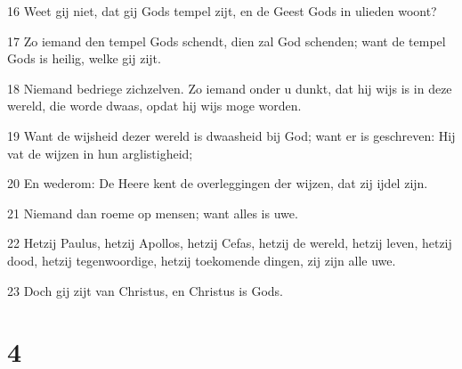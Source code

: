 \par 16 Weet gij niet, dat gij Gods tempel zijt, en de Geest Gods in ulieden woont?
\par 17 Zo iemand den tempel Gods schendt, dien zal God schenden; want de tempel Gods is heilig, welke gij zijt.
\par 18 Niemand bedriege zichzelven. Zo iemand onder u dunkt, dat hij wijs is in deze wereld, die worde dwaas, opdat hij wijs moge worden.
\par 19 Want de wijsheid dezer wereld is dwaasheid bij God; want er is geschreven: Hij vat de wijzen in hun arglistigheid;
\par 20 En wederom: De Heere kent de overleggingen der wijzen, dat zij ijdel zijn.
\par 21 Niemand dan roeme op mensen; want alles is uwe.
\par 22 Hetzij Paulus, hetzij Apollos, hetzij Cefas, hetzij de wereld, hetzij leven, hetzij dood, hetzij tegenwoordige, hetzij toekomende dingen, zij zijn alle uwe.
\par 23 Doch gij zijt van Christus, en Christus is Gods.

\chapter{4}

